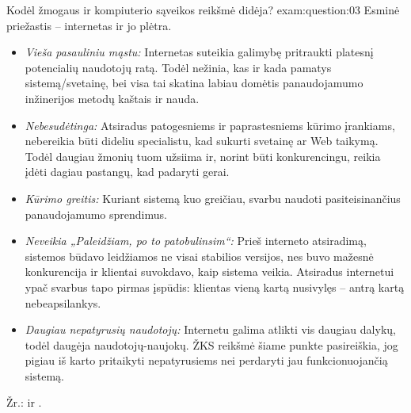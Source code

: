 \begin{question}{%
  Kodėl žmogaus ir kompiuterio sąveikos reikšmė didėja?
  }{exam:question:03}
  Esminė priežastis – internetas ir jo plėtra. 
  \begin{itemize}
    \item \emph{Vieša pasauliniu mąstu:}
      Internetas suteikia galimybę pritraukti platesnį potencialių
      naudotojų ratą. Todėl nežinia, kas ir kada pamatys
      sistemą/svetainę, bei visa tai skatina labiau domėtis
      panaudojamumo inžinerijos metodų kaštais ir nauda.
    \item \emph{Nebesudėtinga:}
      Atsiradus patogesniems ir paprastesniems kūrimo įrankiams,
      nebereikia būti dideliu specialistu, kad sukurti svetainę ar Web
      taikymą. Todėl daugiau žmonių tuom užsiima ir, norint būti
      konkurencingu, reikia įdėti  dagiau pastangų, kad padaryti
      gerai.
    \item \emph{Kūrimo greitis:}
      Kuriant sistemą kuo greičiau, svarbu naudoti pasiteisinančius
      panaudojamumo sprendimus.
    \item \emph{Neveikia „Paleidžiam, po to patobulinsim“:}
      Prieš interneto atsiradimą, sistemos  būdavo leidžiamos ne
      visai stabilios versijos, nes buvo mažesnė konkurencija ir
      klientai suvokdavo, kaip sistema veikia. Atsiradus internetui
      ypač svarbus tapo  pirmas įspūdis: klientas vieną kartą
      nusivylęs – antrą kartą nebeapsilankys.
    \item \emph{Daugiau nepatyrusių naudotojų:}
      Internetu galima atlikti vis daugiau dalykų, todėl daugėja
      naudotojų-naujokų. ŽKS reikšmė šiame punkte pasireiškia,
      jog pigiau iš karto pritaikyti nepatyrusiems nei perdaryti jau
      funkcionuojančią sistemą.
  \end{itemize}
  Žr.: \cite[28--29]{skaidres-1} ir \cite[38--48]{skaidres-1}.
\end{question}

